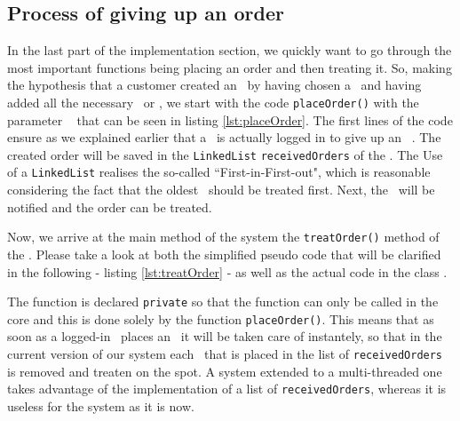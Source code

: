 

\subsection{Process of giving up an order} %
\label{ssub:process_of_giving_up_an_order}

In the last part of the implementation section, we quickly want to go through the most
important functions being placing an order and then treating it. 
So, making the hypothesis that a customer created an \Order~by having chosen a
\Restaurant~and having added all the necessary \Meal~or \Dish,
we start with the code \lstinline|placeOrder()| with the parameter \Order~ that can be
seen in listing \ref{lst:placeOrder}. 
The first lines of the code ensure as we explained earlier that a \Customer~is
actually logged in to give up an \Order~. The created order will be saved in the
\lstinline|LinkedList| \lstinline|receivedOrders| of the \Core. The Use of a
\lstinline|LinkedList| realises the so-called ``First-in-First-out", which is reasonable considering the fact that the oldest \Order~should be treated first.
Next, the \Customer~will be notified and the order can be treated.

Now, we arrive at the main method of the system the \lstinline|treatOrder()| method of
the \Core. Please take a look at both the simplified pseudo code that will be
clarified in the following - listing \ref{lst:treatOrder} - as well as the actual code
in the class \Core.

The function is declared \lstinline|private| so that the function can only be
called in the core and this is done solely by the function \lstinline|placeOrder()|.
This means that as soon as a logged-in \Customer~places an \Order~it will be taken
care of instantely, so that in the current version of our system each \Order~that is
placed in the list of \lstinline|receivedOrders| is removed and treaten on the spot.
A system extended to a multi-threaded one takes advantage of the implementation of
a list of \lstinline|receivedOrders|, whereas it is useless for the system as it is now. 

